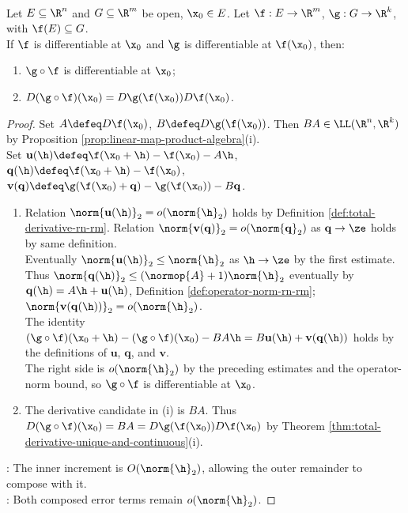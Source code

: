 \begin{theorem} \label{thm:chain-rule-several-variables} \\
Let $E\subseteq\R^n$ and $G\subseteq\R^m$ be open, $\x_0\in E$. Let $\f:E\to\R^m$, $\g:G\to\R^k$, with $\f(E)\subseteq G$.\\
If $\f$ is differentiable at $\x_0$ and $\g$ is differentiable at $\f(\x_0)$, then:
\begin{enumerate}[label=(\roman*)]
\setlength{\itemsep}{0pt}
\item $\g\circ\f$ is differentiable at $\x_0$;
\item $D(\g\circ\f)(\x_0)=D\g(\f(\x_0))D\f(\x_0)$.
\end{enumerate}
\begin{proof}
Set $A\defeq D\f(\x_0)$, $B\defeq D\g(\f(\x_0))$. Then $BA\in\LL(\R^n,\R^k)$ by Proposition \ref{prop:linear-map-product-algebra}(i).\\
Set $\mathbf u(\h)\defeq\f(\x_0+\h)-\f(\x_0)-A\h$, $\mathbf q(\h)\defeq\f(\x_0+\h)-\f(\x_0)$, $\mathbf v(\mathbf q)\defeq\g(\f(\x_0)+\mathbf q)-\g(\f(\x_0))-B\mathbf q$.
\begin{enumerate}[label=(\roman*)]
\setlength{\itemsep}{0pt}
\item Relation $\norm{\mathbf u(\h)}_2=o(\norm{\h}_2)$ holds by Definition \ref{def:total-derivative-rn-rm}. Relation $\norm{\mathbf v(\mathbf q)}_2=o(\norm{\mathbf q}_2)$ as $\mathbf q\to\ze$ holds by same definition.\\
Eventually $\norm{\mathbf u(\h)}_2\leq\norm{\h}_2$ as $\h\to\ze$ by the first estimate.\\
Thus $\norm{\mathbf q(\h)}_2\leq(\normop{A}+1)\norm{\h}_2$ eventually by $\mathbf q(\h)=A\h+\mathbf u(\h)$, Definition \ref{def:operator-norm-rn-rm}; $\norm{\mathbf v(\mathbf q(\h))}_2=o(\norm{\h}_2)$.\\
The identity $(\g\circ\f)(\x_0+\h)-(\g\circ\f)(\x_0)-BA\h=B\mathbf u(\h)+\mathbf v(\mathbf q(\h))$ holds by the definitions of $\mathbf u$, $\mathbf q$, and $\mathbf v$.\\
The right side is $o(\norm{\h}_2)$ by the preceding estimates and the operator-norm bound, so $\g\circ\f$ is differentiable at $\x_0$.
\item The derivative candidate in (i) is $BA$. Thus $D(\g\circ\f)(\x_0)=BA=D\g(\f(\x_0))D\f(\x_0)$ by Theorem \ref{thm:total-derivative-unique-and-continuous}(i).
\end{enumerate}
: The inner increment is $O(\norm{\h}_2)$, allowing the outer remainder to compose with it.\\
: Both composed error terms remain $o(\norm{\h}_2)$.
\end{proof}
\end{theorem}

